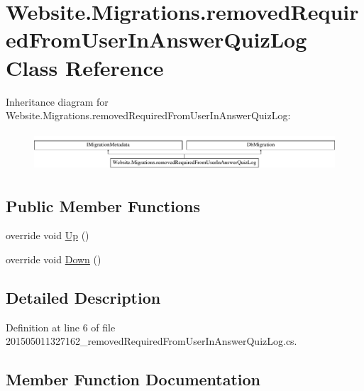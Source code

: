 \hypertarget{class_website_1_1_migrations_1_1removed_required_from_user_in_answer_quiz_log}{}\section{Website.\+Migrations.\+removed\+Required\+From\+User\+In\+Answer\+Quiz\+Log Class Reference}
\label{class_website_1_1_migrations_1_1removed_required_from_user_in_answer_quiz_log}
Inheritance diagram for Website.\+Migrations.\+removed\+Required\+From\+User\+In\+Answer\+Quiz\+Log\+:\begin{figure}[H]
\begin{center}
\leavevmode
\includegraphics[height=1.454545cm]{class_website_1_1_migrations_1_1removed_required_from_user_in_answer_quiz_log}
\end{center}
\end{figure}
\subsection*{Public Member Functions}
\begin{DoxyCompactItemize}
\item 
override void \hyperlink{class_website_1_1_migrations_1_1removed_required_from_user_in_answer_quiz_log_a5d36187dce82364de35c58feddf4141d}{Up} ()
\item 
override void \hyperlink{class_website_1_1_migrations_1_1removed_required_from_user_in_answer_quiz_log_aa8052fe8565c04e76515c4a0d9413b0a}{Down} ()
\end{DoxyCompactItemize}


\subsection{Detailed Description}


Definition at line 6 of file 201505011327162\+\_\+removed\+Required\+From\+User\+In\+Answer\+Quiz\+Log.\+cs.



\subsection{Member Function Documentation}
\hypertarget{class_website_1_1_migrations_1_1removed_required_from_user_in_answer_quiz_log_aa8052fe8565c04e76515c4a0d9413b0a}{}
